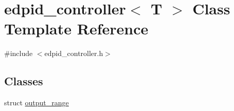 \hypertarget{classedpid__controller}{\section{edpid\-\_\-controller$<$ T $>$ Class Template Reference}
\label{classedpid__controller}
}


{\ttfamily \#include $<$edpid\-\_\-controller.\-h$>$}

\subsection*{Classes}
\begin{DoxyCompactItemize}
\item 
struct \hyperlink{structedpid__controller_1_1output__range}{output\-\_\-range}
\end{DoxyCompactItemize}

